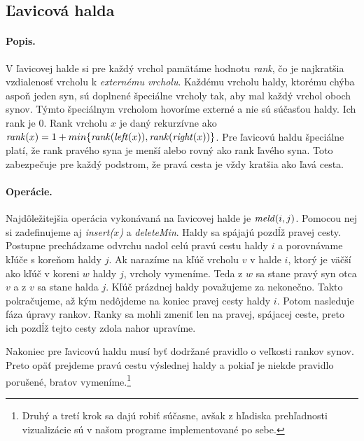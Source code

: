 \subsection{Ľavicová halda} 
\paragraph{Popis.}
V ľavicovej halde si pre každý vrchol pamätáme hodnotu \emph{rank}, čo je najkratšia 
vzdialenosť vrcholu k \emph{externému vrcholu}. Každému vrcholu haldy, ktorému chýba aspoň jeden syn, sú 
doplnené špeciálne vrcholy tak, aby mal každý vrchol oboch synov. Týmto špeciálnym vrcholom hovoríme externé 
a nie sú súčasťou haldy. Ich rank je $0$. Rank vrcholu $x$ je daný rekurzívne ako $\mathop{\mathit{rank}}(x) 
= 1 + min\{\mathop{\mathit{rank}}(\mathop{\mathit{left}}(x)), \mathop{\mathit{rank}}(\mathop{\mathit{right}}(x)) \}$. 
Pre ľavicovú haldu špeciálne platí, že rank pravého syna je menší alebo rovný ako rank ľavého syna.
Toto zabezpečuje pre každý podstrom, že pravá cesta je vždy kratšia ako ľavá cesta.

\paragraph{Operácie.}
Najdôležitejšia operácia vykonávaná na ľavicovej halde je $\mathop{\mathit{meld}}(i,j)$. Pomocou nej si zadefinujeme aj \emph{insert($x$)} a 
\emph{deleteMin}. Haldy sa spájajú pozdĺž pravej cesty. Postupne prechádzame odvrchu nadol celú pravú cestu haldy $i$ a 
porovnávame kľúče s koreňom haldy $j$. Ak narazíme na kľúč vrcholu $v$ v halde $i$, ktorý je väčší ako kľúč v koreni 
$w$ haldy $j$, vrcholy vymeníme. Teda z $w$ sa stane pravý syn otca $v$ a z $v$ sa stane halda $j$. Kľúč prázdnej 
haldy považujeme za nekonečno. Takto pokračujeme, až kým nedôjdeme na koniec pravej cesty haldy $i$.
Potom nasleduje fáza úpravy rankov. Ranky sa mohli zmeniť len na pravej, spájacej ceste, preto ich pozdĺž tejto cesty 
zdola nahor upravíme.

Nakoniec pre ľavicovú haldu musí byť dodržané pravidlo o veľkosti rankov synov. Preto opäť prejdeme pravú cestu 
výslednej haldy a pokiaľ je niekde pravidlo porušené, bratov vymeníme.\footnote{Druhý a tretí krok sa dajú robiť 
súčasne, avšak z hľadiska prehľadnosti vizualizácie sú v našom programe implementované po sebe.}

